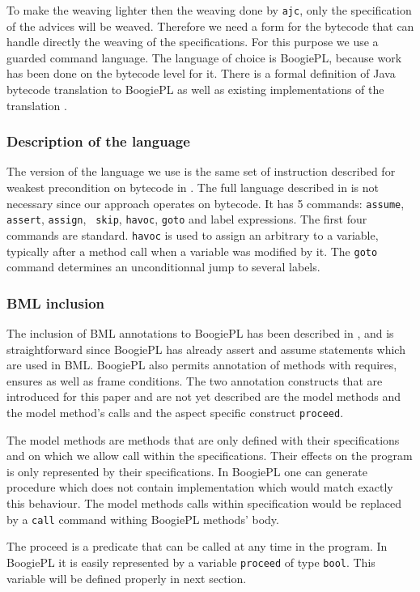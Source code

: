 To make the weaving lighter then the weaving done by {\tt ajc}, only
the specification of the advices will be weaved. Therefore we need a form
for the bytecode that can handle directly the weaving of the specifications.
For this purpose we use a guarded command language. The language of 
choice is BoogiePL, because work has been done on the bytecode level for it.
There is a formal definition of Java bytecode translation to BoogiePL 
\cite{LehnerM07} as well as existing implementations of the translation
\cite{javatrans07,coqtrans06}.

\subsubsection{Description of the language} 
The version of the language we use is the same set of instruction
described for weakest precondition on bytecode in \cite{BarnettL05}.
The full language described in \cite{DeLineL05} is not necessary
since our approach operates on bytecode.
It has 5 commands: {\tt assume}, {\tt assert}, {\tt assign}, {\tt
skip}, {\tt havoc}, {\tt goto} and label expressions.  The first four
commands are standard. {\tt havoc} is used to assign an arbitrary to a
variable, typically after a method call when a variable was modified
by it.  The {\tt goto} command determines an unconditionnal jump to
several labels.

\subsubsection{BML inclusion}
The inclusion of BML annotations to BoogiePL has been described in 
\cite{javatrans07}, and is straightforward since BoogiePL has already 
assert and assume statements which are used in BML.  BoogiePL also
permits annotation of methods with requires, ensures as well as frame
conditions.  The two annotation constructs that are introduced for
this paper and are not yet described are the model methods and the
model method's calls and the aspect specific construct {\tt proceed}.

The model methods are methods that are only defined with their
specifications and on which we allow call within the
specifications. Their effects on the program is only represented by
their specifications. In BoogiePL one can generate procedure which 
does not contain implementation which would match exactly this behaviour.
The model methods calls within specification would be replaced by a
{\tt call} command withing BoogiePL methods' body.

The proceed is a predicate that can be called at any time in the program.
In BoogiePL it is easily represented by a variable {\tt proceed} 
of type {\tt bool}. This variable will be defined properly in next section.

